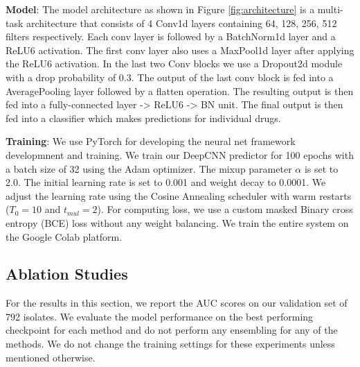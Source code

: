 \documentclass{article}
\begin{document}
\textbf{Model}: The model architecture as shown in Figure \ref{fig:architecture} is a multi-task architecture that 
consists of 4 Conv1d layers containing
{64, 128, 256, 512} filters respectively. Each conv layer is followed by a BatchNorm1d layer and a ReLU6
activation. The first conv layer also uses a MaxPool1d layer after applying the ReLU6 activation. In the
last two Conv blocks we use a Dropout2d module with a drop probability of 0.3. The output of the last conv
block is fed into a AveragePooling layer followed by a flatten operation. The resulting output is then
fed into a fully-connected layer -> ReLU6 -> BN unit. The final output is then fed into a classifier which
makes predictions for individual drugs.

\textbf{Training}: We use PyTorch \cite{paszke2019pytorch} for developing the neural net
framework developmnent and training. We train our DeepCNN predictor for 100 epochs with a batch size of 32
using the Adam optimizer. The mixup parameter $\alpha$ is set to 2.0. The initial
learning rate is set to 0.001 and weight decay to 0.0001. We adjust the learning rate using the Cosine Annealing
scheduler with warm restarts \cite{loshchilov2017sgdr} ($T_0 = 10$ and $t_{mul}=2$). For computing loss, we use a custom masked
Binary cross entropy (BCE) loss without any weight balancing. We train the entire system on the Google Colab
platform.

\subsection{Ablation Studies}
For the results in this section, we report the AUC scores on our validation set of 792 isolates.
We evaluate the model performance on the best performing checkpoint for each method and do
not perform any ensembling for any of the methods. We do not change the training settings for these
experiments unless mentioned otherwise.
\end{document}
